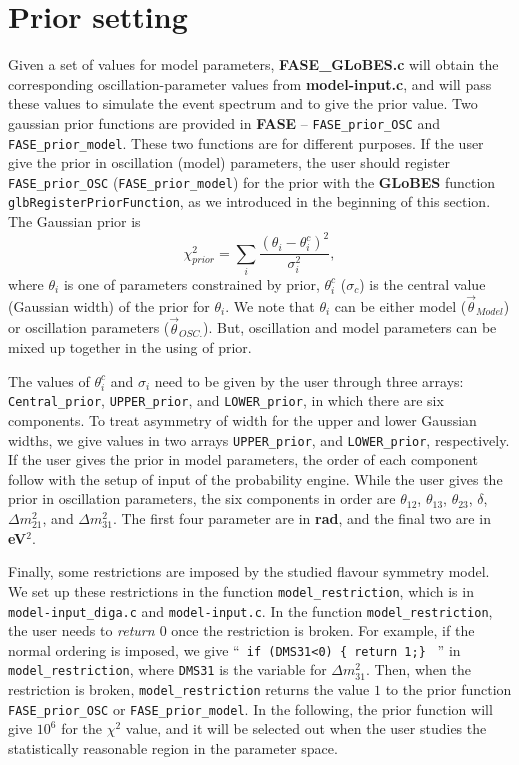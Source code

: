 \documentclass[aps,prd,nofootinbib,preprint]{revtex4}
\begin{document}
\section{Prior setting}\label{sec:prior}
Given a set of values for model parameters, \textbf{FASE\_GLoBES.c} will obtain the corresponding oscillation-parameter values from \textbf{model-input.c}, and will pass these values to simulate the event spectrum and to give the prior value. Two gaussian prior functions are provided in \textbf{FASE} -- \texttt{FASE\_prior\_OSC} and \texttt{FASE\_prior\_model}. These two functions are for different purposes. If the user give the prior in oscillation (model) parameters, the user should register \texttt{FASE\_prior\_OSC} (\texttt{FASE\_prior\_model}) for the prior with the \textbf{GLoBES} function \texttt{glbRegisterPriorFunction}, as we introduced in the beginning of this section. The Gaussian prior is 
\begin{equation}\label{eq:prior}
\chi^2_{prior}=\sum_{i} \frac{(\theta_i-\theta^c_i)^2}{\sigma_i^2},
\end{equation}
 where $\theta_i$ is one of parameters constrained by prior, $\theta^c_i$ ($\sigma_c$) is the central value (Gaussian width) of the prior for $\theta_i$. We note that $\theta_i$ can be either model ($\vec{\theta}_{Model}$) or oscillation parameters ($\vec{\theta}_{OSC.}$).
 But, oscillation and model parameters can be mixed up together in the using of prior. 

The values of $\theta^c_i$ and $\sigma_i$ need to be given by the user through three arrays: \texttt{Central\_prior}, \texttt{UPPER\_prior}, and \texttt{LOWER\_prior}, in which there are six components. To treat asymmetry of width for the upper and lower Gaussian widths, we give values in two arrays \texttt{UPPER\_prior}, and \texttt{LOWER\_prior}, respectively. If the user gives the prior in model parameters, the order of each component follow with the setup of input of the probability engine. While the user gives the prior in oscillation parameters, the six components in order are $\theta_{12}$, $\theta_{13}$, $\theta_{23}$, $\delta$, $\Delta m_{21}^2$, and  $\Delta m_{31}^2$. The first four parameter are in \textbf{rad}, and the final two are in \textbf{eV$^2$}.

Finally, some restrictions are imposed by the studied flavour symmetry model. We set up these restrictions in the function \texttt{model\_restriction}, which is in \texttt{model-input\_diga.c} and \texttt{model-input.c}. In the function \texttt{model\_restriction}, the user needs to \textit{return $0$} once the restriction is broken. For example, if the normal ordering is imposed, we give ``\texttt{ if (DMS31<0) \{ return 1;\} } '' in \texttt{model\_restriction}, where \texttt{DMS31} is the variable for $\Delta m_{31}^2$. Then, when the restriction is broken, \texttt{model\_restriction} returns the value $1$ to the prior function \texttt{FASE\_prior\_OSC} or \texttt{FASE\_prior\_model}. In the following, the prior function will give $10^6$ for the $\chi^2$ value, and it will be selected out when the user studies the statistically reasonable region in the parameter space.  
\end{document}
